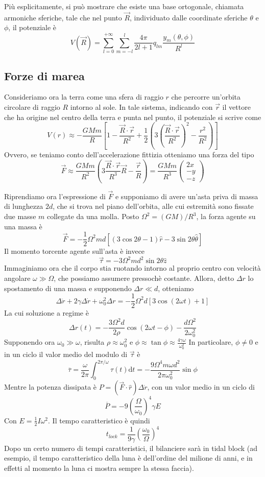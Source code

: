 \documentclass[a4paper,11pt]{article}
\begin{document}
\noindent Più esplicitamente, si può mostrare che esiste una base ortogonale, chiamata armoniche sferiche, tale che nel punto $\vec{R}$, individuato dalle coordinate sferiche $\theta$ e $\phi$, il potenziale è
$$V(\vec{R})=\sum_{l=0}^{+\infty}\sum_{m=-l}^{l}\frac{4\pi}{2l+1}q_{lm}\frac{y_m(\theta,\phi)}{R^l}$$
\subsection{Forze di marea}
Consideriamo ora la terra come una sfera di raggio $r$ che percorre un'orbita circolare di raggio $R$ intorno al sole. In tale sistema, indicando con $\vec{r}$ il vettore che ha origine nel centro della terra e punta nel punto, il potenziale si scrive come
$$V(r)\approx-\frac{GMm}{R}\left[1-\frac{\vec{R}\cdot\vec{r}}{R^2}+\frac{1}{2}\left(3\left(\frac{\vec{R}\cdot\vec{r}}{R^2}\right)^2-\frac{r^2}{R^2}\right)\right]$$
Ovvero, se teniamo conto dell'accelerazione fittizia otteniamo una forza del tipo
$$\vec{F}\approx\frac{GMm}{R^2}\left(3\frac{\vec{R}\cdot\vec{r}}{R^3}\vec{R}-\frac{\vec{r}}{R}\right)=\frac{GMm}{R^3}\left(\begin{array}{c}
2x \nonumber \\
-y \nonumber \\
-z \nonumber
\end{array}\right)$$

Riprendiamo ora l'espressione di $\vec{F}$ e supponiamo di avere un'asta priva di massa di lunghezza $2d$, che si trova nel piano dell'orbita, alle cui estremità sono fissate due masse $m$ collegate da una molla. Posto $\Omega^2=(GM)/R^3$, la forza agente su una massa è 
$$\vec{F}=-\frac{1}{2}\Omega^2md\left[(3\cos2\theta-1)\hat{r}-3\sin2\theta\hat{\theta}\right]$$
Il momento torcente agente sull'asta è invece
$$\vec{\tau}=-3\Omega^2md^2\sin2\theta\hat{z}$$
Immaginiamo ora che il corpo stia ruotando intorno al proprio centro con velocità angolare $\omega\gg \Omega$, che possiamo assumere pressochè costante. Allora, detto $\Delta r$ lo spostamento di una massa e supponendo $\Delta r\ll d$, otteniamo
$$\Delta\ddot{r}+2\gamma\Delta\dot{r}+\omega_0^2\Delta r=-\frac{1}{2}\Omega^2d\left[3\cos(2\omega t)+1\right]$$
La cui soluzione a regime è
$$\Delta r(t)=-\frac{3\Omega^2d}{2\rho}\cos(2\omega t-\phi)-\frac{d\Omega^2}{2\omega_0^2}$$
Supponendo ora $\omega_0\gg\omega$, risulta $\rho\approx\omega_0^2$ e $\phi\approx\tan\phi\approx\frac{4\gamma\omega}{\omega_0^2}$
In particolare, $\phi\neq0$ e in un ciclo il valor medio del modulo di $\vec{\tau}$ è
$$\overline{\tau}=\frac{\omega}{2\pi}\int_{0}^{2\pi/\omega}\tau(t)\mathrm{d}t=-\frac{9\Omega^4m\omega d^2}{2\pi\omega_0^2}\sin\phi$$
Mentre la potenza dissipata è $P=(\vec{F}\cdot\hat{r})\Delta\dot{r}$, con un valor medio in un ciclo di
$$\overline{P}=-9\left(\frac{\Omega}{\omega_0}\right)^4\gamma E$$
Con $E=\frac{1}{2}I\omega^2$. Il tempo caratteristico è quindi
$$t_{lock}=\frac{1}{9\gamma}\left(\frac{\omega_0}{\Omega}\right)^4$$
Dopo un certo numero di tempi caratteristici, il bilanciere sarà in tidal block (ad esempio, il tempo caratteristico della luna è dell'ordine del milione di anni, e in effetti al momento la luna ci mostra sempre la stessa faccia).
\vspace{5mm}
\end{document}
